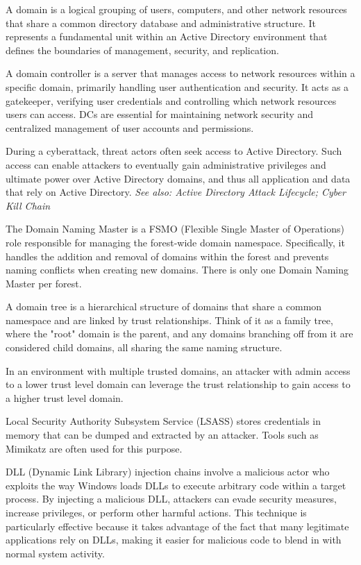  A domain is a logical grouping of users, computers, and other network resources that share a common directory database and administrative structure. It represents a fundamental unit within an Active Directory environment that defines the boundaries of management, security, and replication.  

 A domain controller is a server that manages access to network resources within a specific domain, primarily handling user authentication and security. It acts as a gatekeeper, verifying user credentials and controlling which network resources users can access. DCs are essential for maintaining network security and centralized management of user accounts and permissions.

 During a cyberattack, threat actors often seek access to Active Directory. Such access can enable attackers to eventually gain administrative privileges and ultimate power over Active Directory domains, and thus all application and data that rely on Active Directory.
\textit{See also: Active Directory Attack Lifecycle; Cyber Kill Chain}

 The Domain Naming Master is a FSMO (Flexible Single Master of Operations) role responsible for managing the forest-wide domain namespace. Specifically, it handles the addition and removal of domains within the forest and prevents naming conflicts when creating new domains. There is only one Domain Naming Master per forest.

 A domain tree is a hierarchical structure of domains that share a common namespace and are linked by trust relationships. Think of it as a family tree, where the "root" domain is the parent, and any domains branching off from it are considered child domains, all sharing the same naming structure.

 In an environment with multiple trusted domains, an attacker with admin access to a lower trust level domain can leverage the trust relationship to gain access to a higher trust level domain.

 Local Security Authority Subsystem Service (LSASS) stores credentials in memory that can be dumped and extracted by an attacker. Tools such as Mimikatz are often used for this purpose.

  DLL (Dynamic Link Library) injection chains involve a malicious actor who exploits the way Windows loads DLLs to execute arbitrary code within a target process. By injecting a malicious DLL, attackers can evade security measures, increase privileges, or perform other harmful actions. This technique is particularly effective because it takes advantage of the fact that many legitimate applications rely on DLLs, making it easier for malicious code to blend in with normal system activity.


